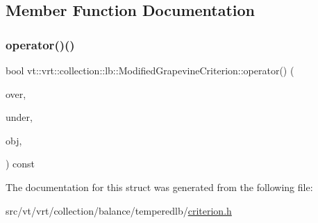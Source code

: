 \subsection{Member Function Documentation}
\mbox{\label{structvt_1_1vrt_1_1collection_1_1lb_1_1_modified_grapevine_criterion_a6331ccac176ead3e10e58809f3e02ef8}} 
\subsubsection{\texorpdfstring{operator()()}{operator()()}}
{\footnotesize\ttfamily bool vt\+::vrt\+::collection\+::lb\+::\+Modified\+Grapevine\+Criterion\+::operator() (\begin{DoxyParamCaption}\item[{\hyperlink{structvt_1_1vrt_1_1collection_1_1lb_1_1_criterion_base_a78e6b14fc6f7b34acac1d7cd4e850180}{Load\+Type}}]{over,  }\item[{\hyperlink{structvt_1_1vrt_1_1collection_1_1lb_1_1_criterion_base_a78e6b14fc6f7b34acac1d7cd4e850180}{Load\+Type}}]{under,  }\item[{\hyperlink{structvt_1_1vrt_1_1collection_1_1lb_1_1_criterion_base_a78e6b14fc6f7b34acac1d7cd4e850180}{Load\+Type}}]{obj,  }\item[{\hyperlink{structvt_1_1vrt_1_1collection_1_1lb_1_1_criterion_base_a78e6b14fc6f7b34acac1d7cd4e850180}{Load\+Type}}]{ }\end{DoxyParamCaption}) const\hspace{0.3cm}{\ttfamily [inline]}}



The documentation for this struct was generated from the following file\+:\begin{DoxyCompactItemize}
\item 
src/vt/vrt/collection/balance/temperedlb/\hyperlink{criterion_8h}{criterion.\+h}\end{DoxyCompactItemize}
